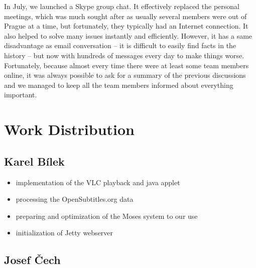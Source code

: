 In July, %
we launched a Skype group chat. It effectively replaced the personal meetings, which was much sought after as usually several members were out of Prague at a time, but fortunately, they typically had an Internet connection.
It also helped to solve many issues instantly and efficiently.
However, it has a same disadvantage as email conversation -- it is difficult to easily find facts in the history -- but now with hundreds of messages every day to make things worse.
Fortunately, because almost every time there were at least some team members online, it was always possible to ask for a summary of the previous discussions and we managed to keep all the team members informed about everything important.



\section{Work Distribution}

\subsection*{Karel Bílek}

\begin{itemize}
	\item implementation of the VLC playback and java applet
	\item processing the OpenSubtitles.org data
	\item preparing and optimization of the Moses system to our use
	\item initialization of Jetty webserver
\end{itemize}

\subsection*{Josef Čech}

